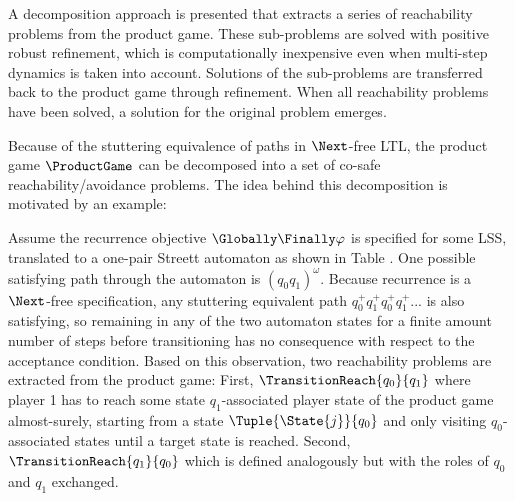 A decomposition approach is presented that extracts a series of reachability problems from the product game.
These sub-problems are solved with positive robust refinement, which is computationally inexpensive even when multi-step dynamics is taken into account.
Solutions of the sub-problems are transferred back to the product game through refinement.
When all reachability problems have been solved, a solution for the original problem emerges.


\startsubsection[title={Transition-based Reachability Decomposition},reference=sec:refinement-transition-decomposition]

    Because of the stuttering equivalence of paths in $\Next$-free LTL, the product game $\ProductGame$ can be decomposed into a set of co-safe reachability/avoidance problems.
    The idea behind this decomposition is motivated by an example:

    Assume the recurrence objective $\Globally \Finally \varphi$ is specified for some LSS, translated to a one-pair Streett automaton as shown in Table .
    One possible satisfying path through the automaton is $(q_0 q_1)^\omega$.
    Because recurrence is a $\Next$-free specification, any stuttering equivalent path $q_0^+ q_1^+ q_0^+ q_1^+ ...$ is also satisfying, so remaining in any of the two automaton states for a finite amount number of steps before transitioning has no consequence with respect to the acceptance condition.
    Based on this observation, two reachability problems are extracted from the product game:
    First, $\TransitionReach{q_0}{q_1}$ where player 1 has to reach some state $q_1$-associated player state of the product game almost-surely, starting from a state $\Tuple{\State{j}}{q_0}$ and only visiting $q_0$-associated states until a target state is reached.
    Second, $\TransitionReach{q_1}{q_0}$ which is defined analogously but with the roles of $q_0$ and $q_1$ exchanged.
    
